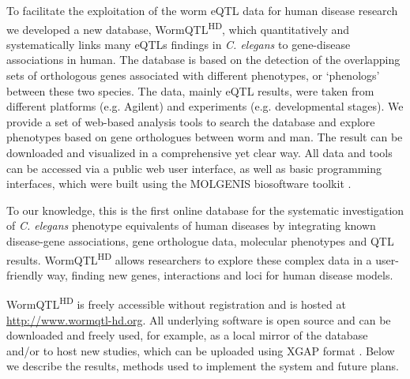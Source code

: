 To facilitate the exploitation of the worm eQTL data for human disease research we developed a new database, WormQTL\textsuperscript{HD}, which quantitatively and systematically links many eQTLs findings in \textsl{C. elegans} to gene-disease associations in human.
The database is based on the detection of the overlapping sets of orthologous genes associated with different phenotypes, or ‘phenologs’ \cite{McGary_2010} between these two species.
The data, mainly eQTL results, were taken from different platforms (e.g. Agilent) and experiments (e.g. developmental stages).
We provide a set of web-based analysis tools to search the database and explore phenotypes based on gene orthologues between worm and man.
The result can be downloaded and visualized in a comprehensive yet clear way. All data and tools can be accessed via a public web user interface, as well as basic programming interfaces, which were built using the MOLGENIS biosoftware toolkit \cite{Swertz_2010a}.

To our knowledge, this is the first online database for the systematic investigation of \textsl{C. elegans} phenotype equivalents of human diseases by integrating known disease-gene associations, gene orthologue data, molecular phenotypes and QTL results.
WormQTL\textsuperscript{HD} allows researchers to explore these complex data in a user-friendly way, finding new genes, interactions and loci for human disease models.

WormQTL\textsuperscript{HD} is freely accessible without registration and is hosted at \url{http://www.wormqtl-hd.org}.
All underlying software is open source and can be downloaded and freely used, for example, as a local mirror of the database and/or to host new studies, which can be uploaded using XGAP format \cite{Swertz_2010b}.
Below we describe the results, methods used to implement the system and future plans.


